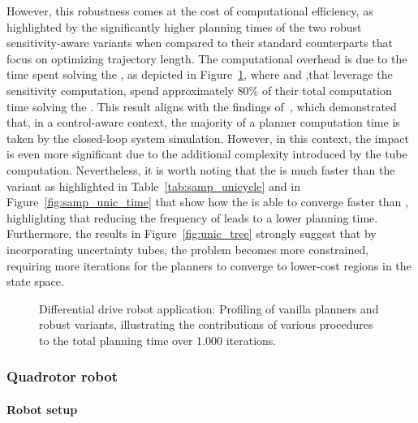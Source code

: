 However, this robustness comes at the cost of computational efficiency, as highlighted by the significantly higher planning times of the two robust sensitivity-aware variants when compared to their standard counterparts that focus on optimizing trajectory length.
The computational overhead is due to the time spent solving the , as depicted in Figure~\ref{fig:profiling_unic}, where  and  ,that leverage the sensitivity computation, spend approximately 80\% of their total computation time solving the . 
This result aligns with the findings of~\cite{cTognon}, which demonstrated that, in a control-aware context, the majority of a planner computation time is taken by the closed-loop system simulation.
However, in this context, the impact is even more significant due to the additional complexity introduced by the tube computation.
Nevertheless, it is worth noting that the  is much faster than the  variant as highlighted in Table~\ref{tab:samp_unicycle} and in Figure~\ref{fig:samp_unic_time} that show how the  is able to converge faster than , highlighting that reducing the frequency of  leads to a lower planning time.
Furthermore, the results in Figure~\ref{fig:unic_tree} strongly suggest that by incorporating uncertainty tubes, the problem becomes more constrained, requiring more iterations for the planners to converge to lower-cost regions in the state space.

\begin{figure} [h!]
    \centering
     
    \caption{Differential drive robot application: Profiling of vanilla planners and robust  variants, illustrating the contributions of various procedures to the total planning time over 1.000 iterations.}%
    \label{fig:profiling_unic}%
\end{figure}

\subsubsection{Quadrotor robot}\label{sec:quad_setup_samp}

\paragraph{Robot setup}

